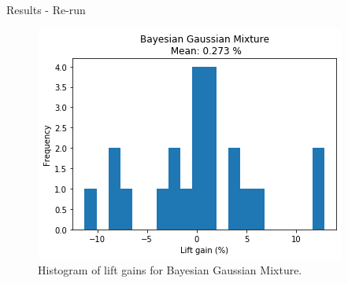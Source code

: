 
\begin{frame}{Results - Re-run \fullNameExperimentII{}}
    \begin{figure}
        \centering
        \includegraphics[width=.75\linewidth]{fig/ch4-bgm_lift_gain_hist.png}
        \caption{Histogram of lift gains for Bayesian Gaussian Mixture.}
    \end{figure}
\end{frame}